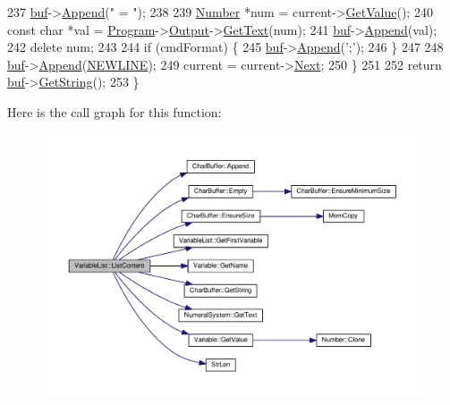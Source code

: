 \begin{DoxyCode}
237         \hyperlink{classVariableList_a11bf03542fab82869135f3f300890376}{buf}->\hyperlink{classCharBuffer_a045b38735f7b3007c1b98d3d7b7feafe}{Append}(\textcolor{stringliteral}{" = "});
238 
239         \hyperlink{structNumber}{Number} *num = current->\hyperlink{classVariable_adb77b2681374245b5d606a1d149d0d91}{GetValue}();
240         \textcolor{keyword}{const} \textcolor{keywordtype}{char} *val = \hyperlink{classProgram}{Program}->\hyperlink{classProgram_ac6e84e81a8bbdf99de5beea93713d8ee}{Output}->\hyperlink{classNumeralSystem_a74dc91c4dbab4a88a123b2a32753f485}{GetText}(num);
241         \hyperlink{classVariableList_a11bf03542fab82869135f3f300890376}{buf}->\hyperlink{classCharBuffer_a045b38735f7b3007c1b98d3d7b7feafe}{Append}(val);
242         \textcolor{keyword}{delete} num;
243 
244         \textcolor{keywordflow}{if} (cmdFormat) \{
245             \hyperlink{classVariableList_a11bf03542fab82869135f3f300890376}{buf}->\hyperlink{classCharBuffer_a045b38735f7b3007c1b98d3d7b7feafe}{Append}(\textcolor{charliteral}{';'});
246         \}
247 
248         \hyperlink{classVariableList_a11bf03542fab82869135f3f300890376}{buf}->\hyperlink{classCharBuffer_a045b38735f7b3007c1b98d3d7b7feafe}{Append}(\hyperlink{platform_8h_a806511f4930171733227c99101dc0606}{NEWLINE});
249         current = current->\hyperlink{classVariable_ac5662d23fccccf25e3565793841ce580}{Next};
250     \}
251 
252     \textcolor{keywordflow}{return} \hyperlink{classVariableList_a11bf03542fab82869135f3f300890376}{buf}->\hyperlink{classCharBuffer_a7dfd3feaaf80f318ba44efe15b1ec44b}{GetString}();
253 \}
\end{DoxyCode}


Here is the call graph for this function\+:
\nopagebreak
\begin{figure}[H]
\begin{center}
\leavevmode
\includegraphics[width=350pt]{d3/d0e/classVariableList_a2898791757231a476a994741a0f8ab94_cgraph}
\end{center}
\end{figure}




